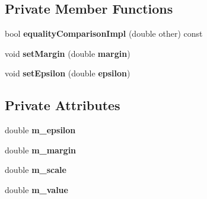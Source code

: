 \subsection*{Private Member Functions}
\begin{DoxyCompactItemize}
\item 
bool \textbf{ equality\+Comparison\+Impl} (double other) const
\item 
void \textbf{ set\+Margin} (double \textbf{ margin})
\item 
void \textbf{ set\+Epsilon} (double \textbf{ epsilon})
\end{DoxyCompactItemize}
\subsection*{Private Attributes}
\begin{DoxyCompactItemize}
\item 
double \textbf{ m\+\_\+epsilon}
\item 
double \textbf{ m\+\_\+margin}
\item 
double \textbf{ m\+\_\+scale}
\item 
double \textbf{ m\+\_\+value}
\end{DoxyCompactItemize}
